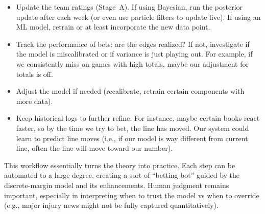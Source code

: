 \documentclass[12pt]{article}
\begin{document}
\begin{enumerate}
    \begin{itemize}
        \item Update the team ratings (Stage~A). If using Bayesian, run the posterior update after each week (or even use particle filters to update live). If using an ML model, retrain or at least incorporate the new data point.
        \item Track the performance of bets: are the edges realized? If not, investigate if the model is miscalibrated or if variance is just playing out. For example, if we consistently miss on games with high totals, maybe our adjustment for totals is off.
        \item Adjust the model if needed (recalibrate, retrain certain components with more data).
        \item Keep historical logs to further refine. For instance, maybe certain books react faster, so by the time we try to bet, the line has moved. Our system could learn to predict line moves (i.e., if our model is way different from current line, often the line will move toward our number).
    \end{itemize}
\end{enumerate}

This workflow essentially turns the theory into practice. Each step can be automated to a large degree, creating a sort of “betting bot” guided by the discrete-margin model and its enhancements. Human judgment remains important, especially in interpreting when to trust the model vs when to override (e.g., major injury news might not be fully captured quantitatively).
\end{document}
